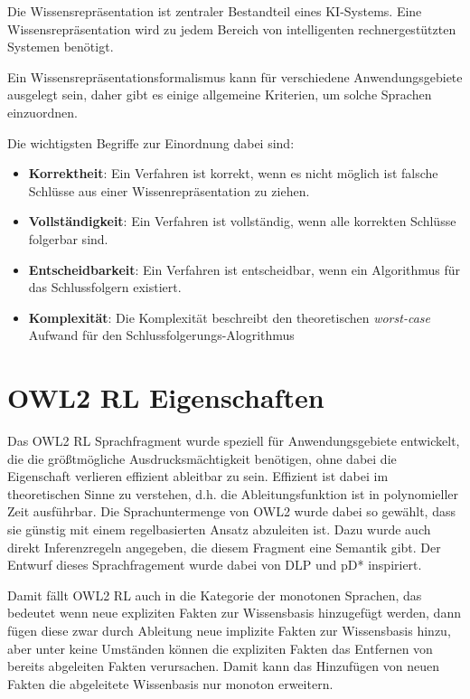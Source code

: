 Die Wissensrepräsentation ist zentraler Bestandteil eines KI-Systems. Eine Wissensrepräsentation wird zu jedem Bereich von intelligenten rechnergestützten Systemen benötigt.

Ein Wissensrepräsentationsformalismus kann für verschiedene Anwendungsgebiete ausgelegt sein, daher gibt es einige allgemeine Kriterien, um solche Sprachen einzuordnen.

Die wichtigsten Begriffe zur Einordnung dabei sind:
\begin{itemize}
	\item \textbf{Korrektheit}:
Ein Verfahren ist korrekt, wenn es nicht möglich ist falsche Schlüsse aus einer Wissenrepräsentation zu ziehen.
	\item \textbf{Vollständigkeit}:
Ein Verfahren ist vollständig, wenn alle korrekten Schlüsse folgerbar sind.
	\item \textbf{Entscheidbarkeit}:
Ein Verfahren ist entscheidbar, wenn ein Algorithmus für das Schlussfolgern existiert.
	\item \textbf{Komplexität}:
Die Komplexität beschreibt den theoretischen \emph{worst-case} Aufwand für den Schlussfolgerungs-Alogrithmus
\end{itemize}

\section{OWL2 RL Eigenschaften}
Das OWL2 RL Sprachfragment wurde speziell für Anwendungsgebiete entwickelt, die die größtmögliche Ausdrucksmächtigkeit benötigen, ohne dabei die Eigenschaft verlieren effizient ableitbar zu sein. Effizient ist dabei im theoretischen Sinne zu verstehen, d.h. die Ableitungsfunktion ist in polynomieller Zeit ausführbar. Die Sprachuntermenge von OWL2 wurde dabei so gewählt, dass sie günstig mit einem regelbasierten Ansatz abzuleiten ist. Dazu wurde auch direkt Inferenzregeln angegeben, die diesem Fragment eine Semantik gibt. Der Entwurf dieses Sprachfragement wurde dabei von DLP \cite{Grosof2003} und pD* \cite{Li2006} inspiriert.

Damit fällt OWL2 RL auch in die Kategorie der monotonen Sprachen, das bedeutet wenn neue expliziten Fakten zur Wissensbasis hinzugefügt werden, dann fügen diese zwar durch Ableitung neue implizite Fakten zur Wissensbasis hinzu, aber unter keine Umständen können die expliziten Fakten das Entfernen von bereits abgeleiten Fakten verursachen. Damit kann das Hinzufügen von neuen Fakten die abgeleitete Wissenbasis nur monoton erweitern.

